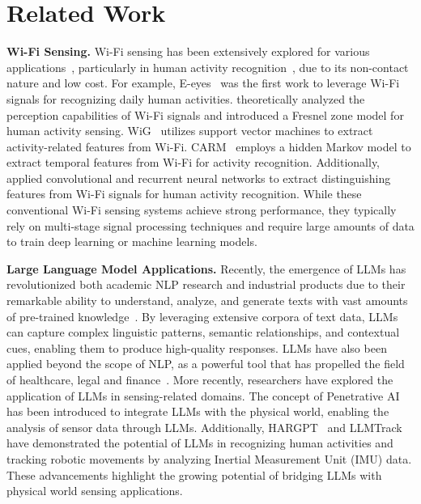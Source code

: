 
\section{Related Work}


\textbf{Wi-Fi Sensing.} Wi-Fi sensing has been extensively explored for various applications~\cite{qian2017inferring, xie2019md, ren2020liquid, jiang2020towards, ren2023person, li2024spacebeat, wang2024multi}, particularly in human activity recognition~\cite{wang2015understanding, zhang2017toward, wang2014eyes}, due to its non-contact nature and low cost.
For example, E-eyes~\cite{wang2014eyes} was the first work to leverage Wi-Fi signals for recognizing daily human activities. \citet{zhang2017toward} theoretically analyzed the perception capabilities of Wi-Fi signals and introduced a Fresnel zone model for human activity sensing. WiG~\cite{he2015wig} utilizes support vector machines to extract activity-related features from Wi-Fi. CARM~\cite{wang2015understanding} employs a hidden Markov model to extract temporal features from Wi-Fi for activity recognition. Additionally, \citet{yang2019learning} applied convolutional and recurrent neural networks to extract distinguishing features from Wi-Fi signals for human activity recognition.
While these conventional Wi-Fi sensing systems achieve strong performance, they typically rely on multi-stage signal processing techniques and require large amounts of data to train deep learning or machine learning models.

\noindent
\textbf{Large Language Model Applications.} Recently, the emergence of LLMs has revolutionized both academic NLP research and industrial
products due to their remarkable ability to understand, analyze, and generate texts with vast
amounts of pre-trained knowledge~\cite{zhao2023survey,zhang2023summit,liu2023pre,zhang2024systematic}. By leveraging extensive corpora of text data, LLMs can capture
complex linguistic patterns, semantic relationships, and contextual cues, enabling them to produce
high-quality responses. LLMs have also been applied beyond the scope of NLP, as a powerful tool that has
propelled the field of healthcare, legal and finance~\cite{chen2024survey,yuan2024structure,he2025survey}. 
More recently, researchers have explored the application of LLMs in sensing-related domains. The concept of Penetrative AI~\cite{xu2024penetrative} has been introduced to integrate LLMs with the physical world, enabling the analysis of sensor data through LLMs. Additionally, HARGPT~\cite{ji2024hargpt} and LLMTrack~\cite{yang2024you} have demonstrated the potential of LLMs in recognizing human activities and tracking robotic movements by analyzing Inertial Measurement Unit (IMU) data. These advancements highlight the growing potential of bridging LLMs with physical world sensing applications.

